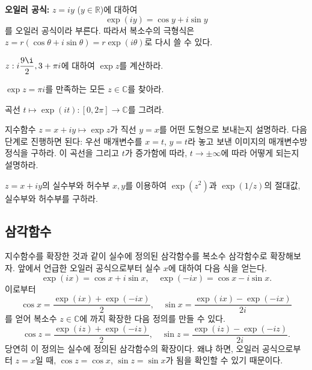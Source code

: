 {\bf 오일러 공식: }
$z=iy$ ($y\in \mathbb R$)에 대하여
$$
\exp(iy) = \cos y + i \sin y
$$
를 오일러 공식이라 부른다.
따라서 복소수의 극형식은 $z=r(\cos\theta + i\sin\theta) = r\exp(i\theta)$로
다시 쓸 수 있다.

\begin{salt_exercise} \label{ex-1-31}
$z: i\dfrac{9\i}2, 3+\pi i$에 대하여
$\exp z$를 계산하라.
\end{salt_exercise}

\begin{salt_exercise} \label{ex-1-32}
$\exp z = \pi i$를 만족하는 모든 $z\in\mathbb C$를 찾아라.
\end{salt_exercise}

\begin{salt_exercise} \label{ex-1-33}
곡선 $t\mapsto \exp(it):[0,2\pi] \to \mathbb C$를 그려라.
\end{salt_exercise}

\begin{salt_exercise} \label{ex-1-34}
지수함수 $z=x+iy \mapsto \exp z$가 직선 $y=x$를 어떤 도형으로 보내는지 설명하라.
다음 단계로 진행하면 된다:
우선 매개변수를 $x=t$, $y=t$라 놓고
보낸 이미지의 매개변수방정식을 구하라.
이 곡선을 그리고 $t$가 증가함에 따라, $t\to\pm\infty$에 따라 어떻게 되는지 설명하라.
\end{salt_exercise}

\begin{salt_exercise} \label{ex-1-35}
$z=x+iy$의 실수부와 허수부 $x,y$를 이용하여
$\exp(z^2)$과 $\exp(1/z)$의 절대값, 실수부와 허수부를 구하라.
\end{salt_exercise}


\subsection{삼각함수}\label{sec-1-4-2}

지수함수를 확장한 것과 같이
실수에 정의된 삼각함수를 복소수 삼각함수로 확장해보자.
앞에서 언급한 오일러 공식으로부터 실수 $x$에 대하여 다음 식을 얻는다.
$$
\exp(ix) = \cos x + i \sin x, \quad
\exp(-ix) = \cos x - i \sin x.
$$
이로부터 
$$
\cos x = \dfrac{\exp(ix) + \exp(-ix)}2, \quad
\sin x = \dfrac{\exp(ix) - \exp(-ix)}{2i}
$$
를 얻어 복소수 $z\in\mathbb C$에 까지 확장한 다음 정의를 만들 수 있다.
$$
\cos z = \dfrac{\exp(iz) + \exp(-iz)}2, \quad
\sin z = \dfrac{\exp(iz) - \exp(-iz)}{2i}.
$$
당연히 이 정의는 실수에 정의된 삼각함수의 확장이다.
왜냐 하면, 오일러 공식으로부터 
$z=x$일 때, $\cos z = \cos x$, $\sin z = \sin x$가 됨을 확인할 수 있기 때문이다.

